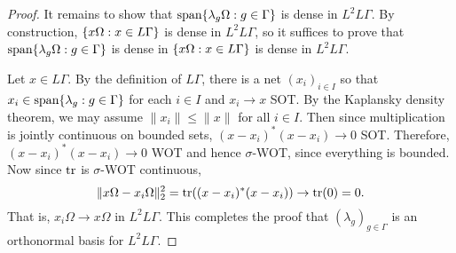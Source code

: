 \documentclass[a4paper,10pt]{report}
\DeclarePairedDelimiter{\set}{\{}{\}}
\begin{document}
\begin{enumerate}
\begin{enumerate}
\begin{proof}
					It remains to show that $\text{span}\set{\lambda_g\Omega : g \in \Gamma}$
					is dense in $L^2L\Gamma$.
					By construction, $\set{x\Omega : x \in L\Gamma}$ is dense in $L^2L\Gamma$,
					so it suffices to prove that $\text{span}\set{\lambda_g\Omega : g \in \Gamma}$
					is dense in $\set{x\Omega : x \in L\Gamma}$ is dense in $L^2L\Gamma$.
					
					Let $x \in L\Gamma$.
					By the definition of $L\Gamma$, there is a net $(x_i)_{i \in I}$
					so that $x_i \in \text{span}\set{\lambda_g : g \in \Gamma}$
					for each $i \in I$ and $x_i \to x$ SOT.
					By the Kaplansky density theorem,
					we may assume $\|x_i\| \le \|x\|$ for all $i \in I$.
					Then since multiplication is jointly continuous on bounded sets,
					$(x - x_i)^*(x - x_i) \to 0$ SOT.
					Therefore, $(x - x_i)^*(x - x_i) \to 0$ WOT and hence $\sigma$-WOT,
					since everything is bounded.
					Now since $\operatorname{tr}$ is $\sigma$-WOT continuous,
					$$\|x\Omega - x_i\Omega\|_2^2 = \operatorname{tr}((x - x_i)^*(x - x_i)) \to \operatorname{tr}(0) = 0.$$
					That is, $x_i\Omega \to x\Omega$ in $L^2L\Gamma$.
					This completes the proof that $(\lambda_g)_{g \in \Gamma}$
					is an orthonormal basis for $L^2L\Gamma$.
					

\end{proof}
\end{enumerate}
\end{enumerate}
\end{document}
